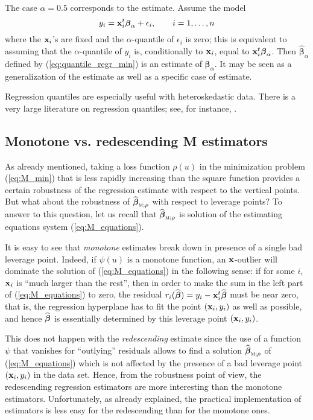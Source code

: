 The case $\alpha=0.5$ corresponds to the  estimate. Assume the model
\[
    y_{i} = \mathbf x_{i}^t \boldsymbol\beta_{\alpha} + \epsilon_{i},
    \qquad i = 1, \dots, n
\]
where the $\mathbf x_{i}$'s are fixed and the $\alpha$-quantile of
$\epsilon_{i}$ is zero; this is equivalent to assuming that the
$\alpha$-quantile of $y_{i}$ is, conditionally to $\mathbf x_{i}$, equal to
$\mathbf x_{i}^t\boldsymbol\beta_{\alpha}$. Then $\widehat
{\boldsymbol\beta}_{\alpha}$ defined by (\ref{eq:quantile_regr_min}) is an
estimate of $\boldsymbol\beta_{\alpha}$. It may be seen as a generalization of
the  estimate as well as a specific case of  estimate.

Regression quantiles are especially useful with heteroskedastic data. There is
a very large literature on regression quantiles; see, for instance,
\citet{Koenker:2005}.

\subsection{Monotone vs. redescending M estimators}

As already mentioned, taking a loss function $\rho(u)$ in the minimization
problem (\ref{eq:M_min}) that is less rapidly increasing than the square
function provides a certain robustness of the regression  estimate with
respect to the vertical points. But what about the robustness of
$\sthat{\boldsymbol\beta}_{\stsc{M};\rho}$ with respect to leverage points? To
answer to this question, let us recall that
$\sthat{\boldsymbol\beta}_{\stsc{M};\rho}$ is solution of the estimating
equations system (\ref{eq:M_equations}).

It is easy to see that \emph{monotone}  estimates break down in
presence of a single bad leverage point. Indeed, if $\psi(u)$ is a monotone
function, an $\mathbf x$-outlier will dominate the solution of
(\ref{eq:M_equations}) in the following sense: if for some $i$, $\mathbf x_{i}$
is “much larger than the rest”, then in order to make the sum in the left part
of (\ref{eq:M_equations}) to zero, the residual
$r_{i}(\widehat{\boldsymbol\beta}) = y_{i} -
\mathbf x_{i}^t\widehat{\boldsymbol\beta}$ must be near zero, that is, the
regression hyperplane has to fit the point $(\mathbf x_{i}, y_{i})$ as well as
possible, and hence $\widehat{\boldsymbol\beta}$ is essentially determined by
this leverage point $(\mathbf x_{i}, y_{i})$.

This does not happen with the \emph{redescending}  estimate since the
use of a function $\psi$ that vanishes for “outlying” residuals allows to find
a solution $\widehat{\boldsymbol\beta}_{\stsc{M};\rho}$ of
(\ref{eq:M_equations}) which is not affected by the presence of a bad leverage
point $(\mathbf x_{i}, y_{i})$ in the data set. Hence, from the robustness
point of view, the redescending regression  estimators are more interesting
than the monotone  estimators. Unfortunately, as already explained, the
practical implementation of  estimators is less easy for the
redescending than for the monotone ones.

